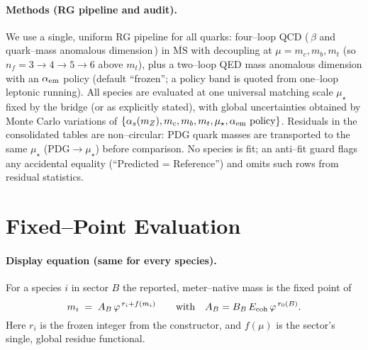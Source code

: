 \documentclass[epjc3]{svjour3}
\begin{document}
\paragraph{Methods (RG pipeline and audit).}
We use a single, uniform RG pipeline for all quarks: four–loop QCD (\,$\beta$ and quark–mass anomalous dimension\,) in $\overline{\mathrm{MS}}$ with decoupling at $\mu=m_c,m_b,m_t$ (so $n_f=3\!\to\!4\!\to\!5\!\to\!6$ above $m_t$), plus a two–loop QED mass anomalous dimension with an $\alpha_{\rm em}$ policy (default “frozen”; a policy band is quoted from one–loop leptonic running). All species are evaluated at one universal matching scale $\mu_\star$ fixed by the bridge (or as explicitly stated), with global uncertainties obtained by Monte Carlo variations of $\{\alpha_s(m_Z),m_c,m_b,m_t,\mu_\star,\text{$\alpha_{\rm em}$ policy}\}$. Residuals in the consolidated tables are non–circular: PDG quark masses are transported to the same $\mu_\star$ (PDG$\to\mu_\star$) before comparison. No species is fit; an anti–fit guard flags any accidental equality (``Predicted = Reference'') and omits such rows from residual statistics.

\section{Fixed–Point Evaluation}

\paragraph{Display equation (same for every species).}
For a species $i$ in sector $B$ the reported, meter–native mass is the fixed point of
\[
m_i \;=\; A_B\,\varphi^{\,r_i + f(m_i)}\qquad
\text{with}\quad A_B=B_B\,E_{\rm coh}\,\varphi^{\,r_0(B)}.
\]
Here $r_i$ is the frozen integer from the constructor, and $f(\mu)$ is the sector’s single, global residue functional.
\end{document}
